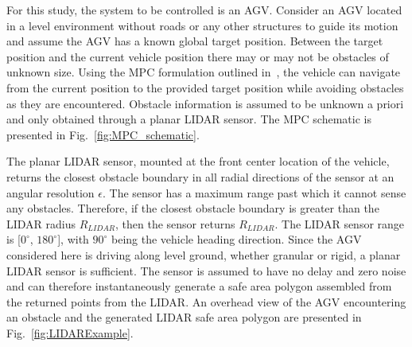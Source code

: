 \documentclass[12pt,onecolumn]{report}
\begin{document}
For this study, the system to be controlled is an AGV. Consider an AGV located in a level environment without roads or any other structures to guide its motion and assume the AGV has a known global target position. Between the target position and the current vehicle position there may or may not be obstacles of unknown size. Using the MPC formulation outlined in~\cite{ModelFidelity2016}, the vehicle can navigate from the current position to the provided target position while avoiding obstacles as they are encountered. Obstacle information is assumed to be unknown a priori and only obtained through a planar LIDAR sensor. The MPC schematic is presented in Fig.~\ref{fig:MPC_schematic}.
%

The planar LIDAR sensor, mounted at the front center location of the vehicle, returns the closest obstacle boundary in all radial directions of the sensor at an angular resolution $\epsilon$. The sensor has a maximum range past which it cannot sense any obstacles. Therefore, if the closest obstacle boundary is greater than the LIDAR radius $R_{LIDAR}$, then the sensor returns $R_{LIDAR}$. The LIDAR sensor range is [$0^\circ$, $180^\circ$], with $90^\circ$ being the vehicle heading direction. Since the AGV considered here is driving along level ground, whether granular or rigid, a planar LIDAR sensor is sufficient. The sensor is assumed to have no delay and zero noise and can therefore instantaneously generate a safe area polygon assembled from the returned points from the LIDAR. An overhead view of the AGV encountering an obstacle and the generated LIDAR safe area polygon are presented in Fig.~\ref{fig:LIDARExample}. 
%
\end{document}
